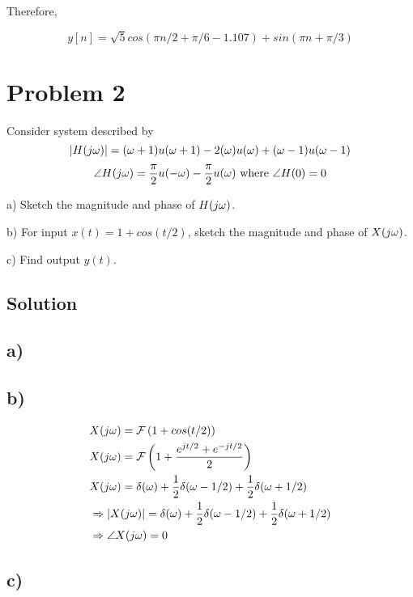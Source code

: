 \documentclass[11pt, fleqn]{article}
\begin{document}
Therefore,

$$ y[n] = \sqrt{5}cos(\pi n/2 + \pi/6 - 1.107) + sin(\pi n + \pi / 3)$$

\pagebreak

\section*{Problem 2}

Consider system described by
$$
| H(j\omega)  | = (\omega + 1)u(\omega + 1) - 2(\omega)u(\omega) + (\omega - 1)u(\omega - 1)
$$
$$
    \angle H(j\omega) = \frac{\pi}{2}u(-\omega) - \frac{\pi}{2}u(\omega) \text{ where } \angle H(0) = 0 
$$

a) Sketch the magnitude and phase of $H(j\omega)$.

b) For input $x(t) = 1 + cos(t/2)$, sketch the magnitude and phase of $X(j\omega)$.

c) Find output $y(t)$.

\subsection*{Solution}

\subsection*{a)}



\subsection*{b)}

\begin{align*}
    &X(j\omega) = \mathcal{F}\left( 1 + cos(t/2) \right) \\
    &X(j\omega) = \mathcal{F}\left( 1 + \frac{e^{jt/2} + e^{-jt/2}}{2} \right) \\
    &X(j\omega) = \delta(\omega) + \frac{1}{2}\delta(\omega - 1/2) + \frac{1}{2}\delta(\omega + 1/2) \\
    &\Rightarrow |X(j\omega)| = \delta(\omega) + \frac{1}{2}\delta(\omega - 1/2) + \frac{1}{2}\delta(\omega + 1/2) \\
    &\Rightarrow \angle X(j\omega) = 0
\end{align*}

\subsection*{c)}
\end{document}
